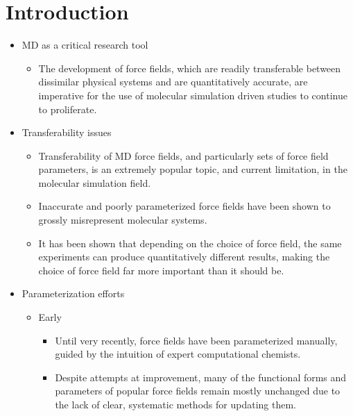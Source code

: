 \documentclass[aps,pre,nofootinbib,superscriptaddress,linenumbers,10pt, draft,tightenlines]{revtex4-1}
\begin{document}
\section{Introduction}
\begin{itemize}
	\item MD as a critical research tool
	\begin{itemize}
		\item The development of force fields, which are readily transferable between dissimilar physical systems and are 
		quantitatively accurate, are imperative for the use of molecular simulation driven studies to continue to proliferate.\cite{villin,villin2,drug_discov}
	\end{itemize}
    \item Transferability issues
    \begin{itemize}
    	\item Transferability of MD force fields, and particularly sets of force field parameters, is an extremely popular 
              topic, and current limitation, in the molecular simulation field.\cite{transferability1,transferability2,
    	      transferability3,transferability4}  
        \item Inaccurate and poorly parameterized force fields have been shown to grossly misrepresent molecular systems.
              \cite{ffcomp1,ffcomp2,robustness} 
        \item It has been shown that depending on the choice of force field, the same experiments can produce quantitatively
              different results, making the choice of force field far more important than it should be. \cite{ffcomp1,ffcomp2,ewen_comparison_2016,petrov_are_2014,guvench_comparison_2008}\\
    \end{itemize}
	\item Parameterization efforts
	\begin{itemize}
		\item Early 
		\begin{itemize}
			\item Until very recently, force fields have been parameterized manually, guided by the intuition of expert computational
			      chemists.\cite{parm94,tip3p,burger,law,combined,rational,aipar,charmm1,charmm2,mm1,mm2,mmff}
			\item Despite attempts at improvement, many of the functional forms and parameters of popular force fields remain mostly 
			      unchanged due to the lack of clear, systematic methods for updating them.\cite{unchanged,monticelli}

\end{itemize}
\end{itemize}
\end{itemize}
\end{document}
